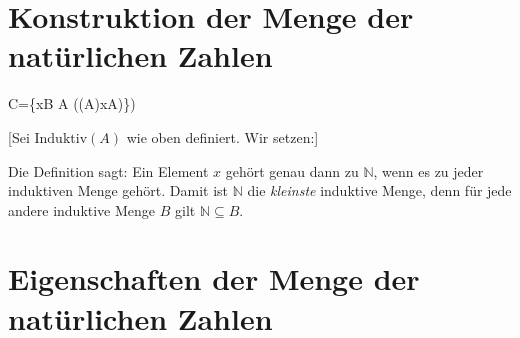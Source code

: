 \documentclass[main.tex]{subfiles}
\begin{document}
\section{Konstruktion der Menge der natürlichen Zahlen}

\begin{tabproofwide}
    {}

    {}
  \proofstepwide{}{}%
    {C=\{x\in B \mid \forall A ((A)\rightarrow x\in A)\})}%
    {}
\end{tabproofwide}


[Sei \(\mathrm{Induktiv}(A)\) wie oben definiert.  Wir setzen:]

\begin{remark}
  Die Definition sagt: Ein Element \(x\) gehört genau dann zu \(\mathbb{N}\), wenn es zu jeder induktiven Menge gehört.  Damit ist \(\mathbb{N}\) die \emph{kleinste} induktive Menge, denn für jede andere induktive Menge \(B\) gilt \(\mathbb{N} \subseteq B\).
\end{remark}

\begin{tabproofwide}
\end{tabproofwide}


\section{Eigenschaften der Menge der natürlichen Zahlen}
\end{document}
